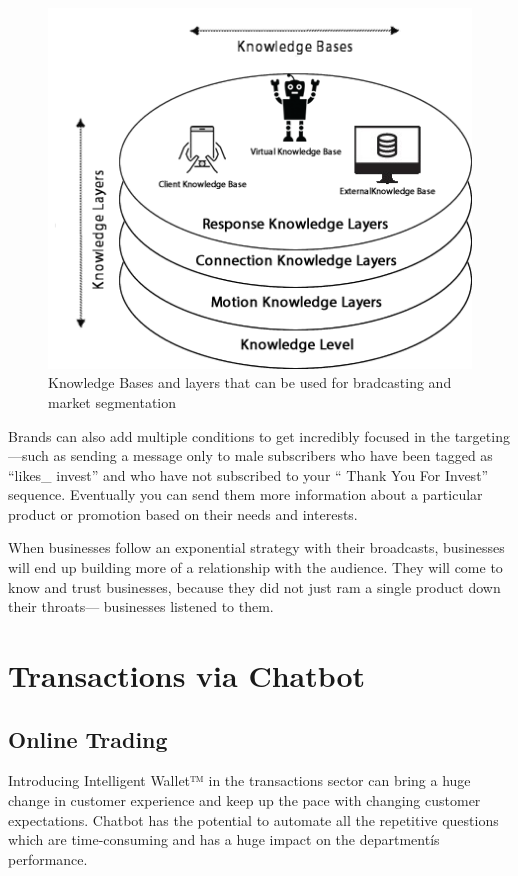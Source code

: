 \documentclass[	DIV=calc,%
							paper=letter,%
							fontsize=12pt%
                            ]{scrartcl}	 					%
\begin{document}
\begin{figure}[H]
\centering
\includegraphics[scale=0.80]{img/ds.png}
\caption{Knowledge Bases and layers that can be used for bradcasting and market segmentation}
\label{ds}
\end{figure}




Brands can also add multiple conditions to get incredibly focused in the targeting —such as sending a message only to male subscribers who have been tagged as ``likes\_ invest'' and who have not subscribed to your `` Thank You For Invest'' sequence. Eventually you can send them more information about a particular product or promotion based on their needs and interests.

When businesses follow an exponential strategy with their broadcasts, businesses will end up building more of a relationship with the audience. They will come to know and trust businesses, because they did not just ram a single product down their throats— businesses listened to them.




\section{\label{sec:level1}Transactions via Chatbot}

\subsection{\label{sec:level1}Online Trading}

Introducing Intelligent Wallet™ in the transactions sector can bring a huge change in customer experience and keep up the pace with changing customer expectations. Chatbot has the potential to automate all the repetitive questions which are time-consuming and has a huge impact on the departmentís performance. 
\end{document}
